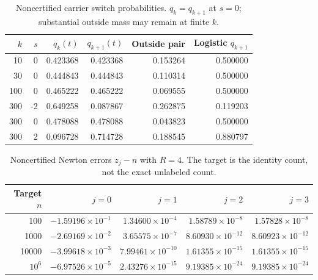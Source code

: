 \begin{table}[htbp]\centering\small
\caption{Noncertified carrier switch probabilities. $q_k=q_{k+1}$ at $s=0$; substantial outside mass may remain at finite $k$.}\label{tab:switch}
\begin{tabular}{r r r r r r}\toprule
$k$ & $s$ & $q_k(t)$ & $q_{k+1}(t)$ & Outside pair & Logistic $q_{k+1}$ \\ \midrule
10 & 0 & 0.423368 & 0.423368 & 0.153264 & 0.500000 \\
30 & 0 & 0.444843 & 0.444843 & 0.110314 & 0.500000 \\
100 & 0 & 0.465222 & 0.465222 & 0.069555 & 0.500000 \\
300 & -2 & 0.649258 & 0.087867 & 0.262875 & 0.119203 \\
300 & 0 & 0.478088 & 0.478088 & 0.043823 & 0.500000 \\
300 & 2 & 0.096728 & 0.714728 & 0.188545 & 0.880797 \\
\bottomrule\end{tabular}\end{table}
\begin{table}[htbp]\centering\small
\caption{Noncertified Newton errors $z_j-n$ with $R=4$. The target is the identity count, not the exact unlabeled count.}\label{tab:inverse}
\begin{tabular}{r r r r r}\toprule
Target $n$ & $j=0$ & $j=1$ & $j=2$ & $j=3$ \\ \midrule
100 & $-1.59196\times10^{-1}$ & $1.34600\times10^{-4}$ & $1.58789\times10^{-8}$ & $1.57828\times10^{-8}$ \\
1000 & $-2.69169\times10^{-2}$ & $3.65575\times10^{-7}$ & $8.60930\times10^{-12}$ & $8.60923\times10^{-12}$ \\
10000 & $-3.99618\times10^{-3}$ & $7.99461\times10^{-10}$ & $1.61355\times10^{-15}$ & $1.61355\times10^{-15}$ \\
$10^6$ & $-6.97526\times10^{-5}$ & $2.43276\times10^{-15}$ & $9.19385\times10^{-24}$ & $9.19385\times10^{-24}$ \\
\bottomrule\end{tabular}\end{table}
\clearpage
